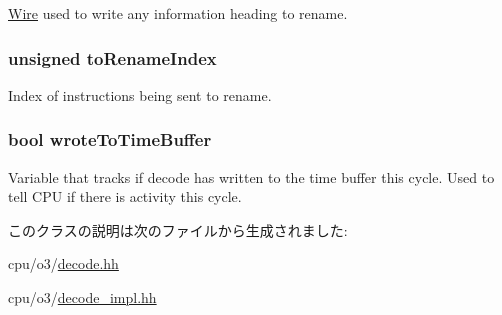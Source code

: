 \label{classDefaultDecode_ac096c67e7877c089a5417aa83a721edc}
\hyperlink{classWire}{Wire} used to write any information heading to rename. \hypertarget{classDefaultDecode_a998ac27e2d5479a5c6e97258d25cea3d}{
\subsubsection[{toRenameIndex}]{\setlength{\rightskip}{0pt plus 5cm}unsigned {\bf toRenameIndex}}}
\label{classDefaultDecode_a998ac27e2d5479a5c6e97258d25cea3d}
Index of instructions being sent to rename. \hypertarget{classDefaultDecode_a2c7e870d4babdac0dc91fc7ffabd0f3d}{
\subsubsection[{wroteToTimeBuffer}]{\setlength{\rightskip}{0pt plus 5cm}bool {\bf wroteToTimeBuffer}}}
\label{classDefaultDecode_a2c7e870d4babdac0dc91fc7ffabd0f3d}
Variable that tracks if decode has written to the time buffer this cycle. Used to tell CPU if there is activity this cycle. 

このクラスの説明は次のファイルから生成されました:\begin{DoxyCompactItemize}
\item 
cpu/o3/\hyperlink{decode_8hh}{decode.hh}\item 
cpu/o3/\hyperlink{decode__impl_8hh}{decode\_\-impl.hh}\end{DoxyCompactItemize}
